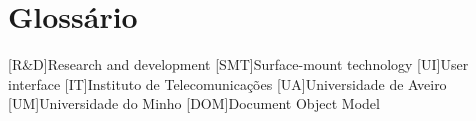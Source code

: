 \chapter{Glossário}

\footnotesize
\SingleSpacing

\begin{multicols}{2}
\begin{acronym}[AAAA]

	[R\&D]{Research and development}
	[SMT]{Surface-mount technology}
	[UI]{User interface}
	[IT]{Instituto de Telecomunicações}
	[UA]{Universidade de Aveiro}
	[UM]{Universidade do Minho}
	[DOM]{Document Object Model}

\end{acronym}
\end{multicols}

